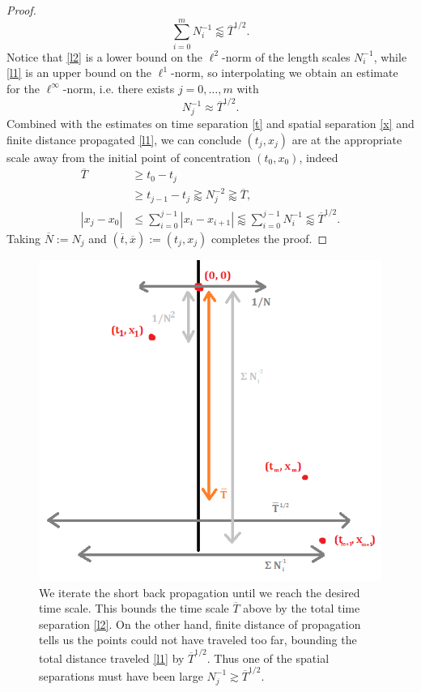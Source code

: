 \begin{proof}
\begin{equation}
			\sum_{i = 0}^m N_i^{-1} \lessapprox \overline T^{1/2}.\label{eq:l1}
		\end{equation}
	Notice that \eqref{l2} is a lower bound on the $\ell^2$-norm of the length scales $N_i^{-1}$, while \eqref{l1} is an upper bound on the $\ell^1$-norm, so interpolating we obtain an estimate for the $\ell^\infty$-norm, i.e. there exists $j = 0, \dots, m$ with
		\[
			N_j^{-1} \approx \overline T^{1/2}.
		\]
	Combined with the estimates on time separation \eqref{t} and spatial separation \eqref{x} and finite distance propagated \eqref{l1}, we can conclude $(t_j, x_j)$ are at the appropriate scale away from the initial point of concentration $(t_0, x_0)$, indeed
		\begin{align*}
			\overline T 
				&\geq t_0 - t_j\\
				&\geq t_{j - 1} - t_j \gtrapprox N_j^{-2} \gtrapprox \overline T, \\
			|x_j - x_0|
				&\leq \sum_{i = 0}^{j - 1} |x_i - x_{i + 1}| \lessapprox \sum_{i = 0}^{j - 1} N_i^{-1} \lessapprox \overline T^{1/2}.	
		\end{align*}
	Taking $\overline N := N_j$ and $(\overline t, \overline x) := (t_j, x_j)$ completes the proof.	
\end{proof}

\begin{figure}[h]
	\begin{center}
		\includegraphics[scale =0.75]{graphics/back}
		\caption{We iterate the short back propagation until we reach the desired time scale. This bounds the time scale $\overline T$ above by the total time separation \eqref{l2}. On the other hand, finite distance of propagation tells us the points could not have traveled too far, bounding the total distance traveled \eqref{l1} by $\overline T^{1/2}$. Thus one of the spatial separations must have been large $N^{-1}_j \gtrsim \overline T^{1/2}$.}
	\end{center}
\end{figure}

